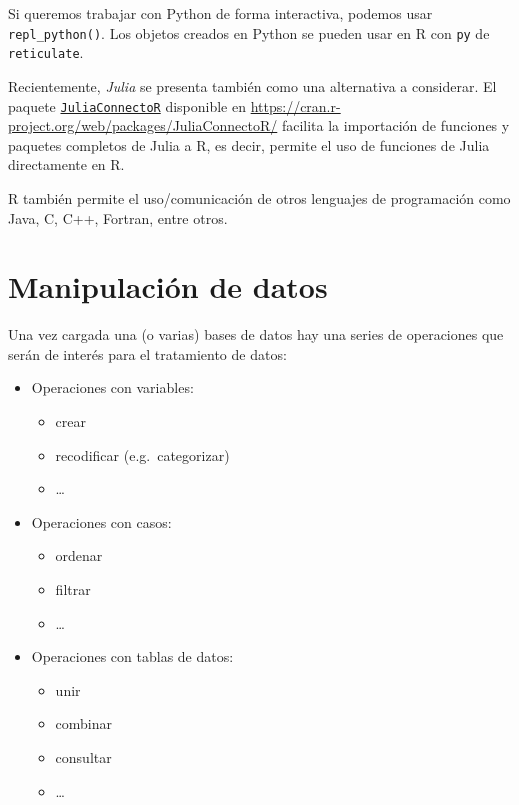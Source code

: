 \documentclass[
]{book}
\newenvironment{Shaded}{\begin{snugshade}}{\end{snugshade}}
\newcommand{\FunctionTok}[1]{\textcolor[rgb]{0.13,0.29,0.53}{\textbf{#1}}}
\newcommand{\NormalTok}[1]{#1}
\newcommand{\OtherTok}[1]{\textcolor[rgb]{0.56,0.35,0.01}{#1}}
\newcommand{\SpecialCharTok}[1]{\textcolor[rgb]{0.81,0.36,0.00}{\textbf{#1}}}
\newcommand{\StringTok}[1]{\textcolor[rgb]{0.31,0.60,0.02}{#1}}
\providecommand{\tightlist}{%
  \setlength{\itemsep}{0pt}\setlength{\parskip}{0pt}}
\begin{document}
\begin{Shaded}
\end{Shaded}

Si queremos trabajar con Python de forma interactiva, podemos usar \texttt{repl\_python()}. Los objetos creados en Python se pueden usar en R con \texttt{py} de \texttt{reticulate}.

Recientemente, \emph{Julia} se presenta también como una alternativa a considerar.
El paquete \href{NA}{\texttt{JuliaConnectoR}} disponible en \url{https://cran.r-project.org/web/packages/JuliaConnectoR/} facilita la importación de funciones y paquetes completos de Julia a R, es decir, permite el uso de funciones de Julia directamente en R.

R también permite el uso/comunicación de otros lenguajes de programación como Java, C, C++, Fortran, entre otros.

\section{Manipulación de datos}\label{manipulaciuxf3n-de-datos}

Una vez cargada una (o varias) bases de datos hay una series de operaciones que serán de interés para el tratamiento de datos:

\begin{itemize}
\tightlist
\item
  Operaciones con variables:

  \begin{itemize}
  \tightlist
  \item
    crear
  \item
    recodificar (e.g.~categorizar)
  \item
    \ldots{}
  \end{itemize}
\item
  Operaciones con casos:

  \begin{itemize}
  \tightlist
  \item
    ordenar
  \item
    filtrar
  \item
    \ldots{}
  \end{itemize}
\item
  Operaciones con tablas de datos:

  \begin{itemize}
  \tightlist
  \item
    unir
  \item
    combinar
  \item
    consultar
  \item
    \ldots{}
  \end{itemize}
\end{itemize}
\end{document}
